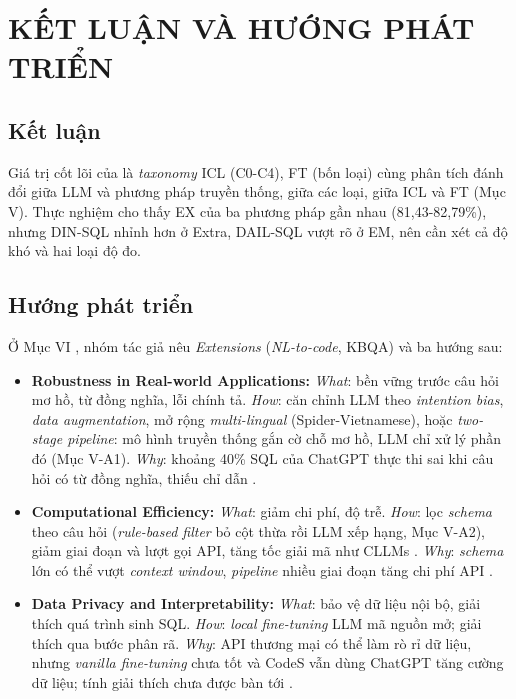 \chapter{KẾT LUẬN VÀ HƯỚNG PHÁT TRIỂN}

\section{Kết luận}

Giá trị cốt lõi của \cite{ref1} là \emph{taxonomy} ICL (C0-C4), FT (bốn loại) cùng phân tích đánh đổi giữa LLM và phương pháp truyền thống, giữa các loại, giữa ICL và FT (Mục V). Thực nghiệm cho thấy EX của ba phương pháp gần nhau (81,43-82,79\%), nhưng DIN-SQL nhỉnh hơn ở Extra, DAIL-SQL vượt rõ ở EM, nên cần xét cả độ khó và hai loại độ đo.

\section{Hướng phát triển}

Ở Mục VI \cite{ref1}, nhóm tác giả nêu \emph{Extensions} (\emph{NL-to-code}, KBQA) và ba hướng sau:

\begin{itemize}
\item \textbf{Robustness in Real-world Applications:} \emph{What}: bền vững trước câu hỏi mơ hồ, từ đồng nghĩa, lỗi chính tả. \emph{How}: căn chỉnh LLM theo \emph{intention bias}, \emph{data augmentation}, mở rộng \emph{multi-lingual} (Spider-Vietnamese), hoặc \emph{two-stage pipeline}: mô hình truyền thống gắn cờ chỗ mơ hồ, LLM chỉ xử lý phần đó (Mục V-A1). \emph{Why}: khoảng 40\% SQL của ChatGPT thực thi sai khi câu hỏi có từ đồng nghĩa, thiếu chỉ dẫn \cite{ref1}.
\item \textbf{Computational Efficiency:} \emph{What}: giảm chi phí, độ trễ. \emph{How}: lọc \emph{schema} theo câu hỏi (\emph{rule-based filter} bỏ cột thừa rồi LLM xếp hạng, Mục V-A2), giảm giai đoạn và lượt gọi API, tăng tốc giải mã như CLLMs \cite{ref9}. \emph{Why}: \emph{schema} lớn có thể vượt \emph{context window}, \emph{pipeline} nhiều giai đoạn tăng chi phí API \cite{ref1}.
\item \textbf{Data Privacy and Interpretability:} \emph{What}: bảo vệ dữ liệu nội bộ, giải thích quá trình sinh SQL. \emph{How}: \emph{local fine-tuning} LLM mã nguồn mở; giải thích qua bước phân rã. \emph{Why}: API thương mại có thể làm rò rỉ dữ liệu, nhưng \emph{vanilla fine-tuning} chưa tốt và CodeS vẫn dùng ChatGPT tăng cường dữ liệu; tính giải thích chưa được bàn tới \cite{ref1}.
\end{itemize}

